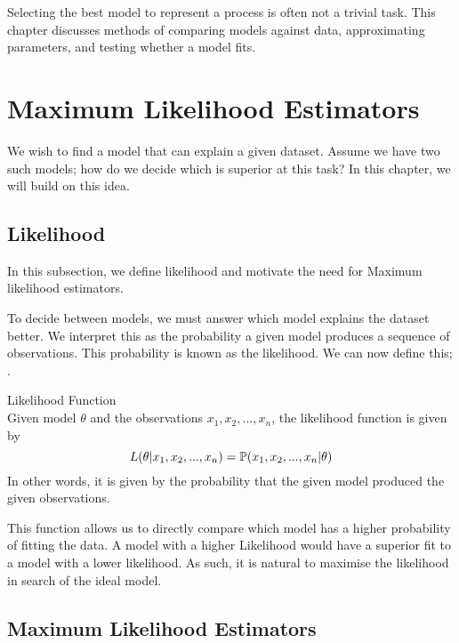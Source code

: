 
Selecting the best model to represent a process is often not a trivial task. This chapter discusses methods of comparing models against data, approximating parameters, and testing whether a model fits. 

\section{Maximum Likelihood Estimators}
\label{Model_Selection:Maximum_Liklihood_Estimators}

We wish to find a model that can explain a given dataset. Assume we have two such models; how do we decide which is superior at this task? In this chapter, we will build on this idea. 

    \subsection{Likelihood}
    \label{Model_Selection:Maximum_Liklihood_Estimators:Likelihood}

    In this subsection, we define likelihood and motivate the need for Maximum likelihood estimators.

    To decide between models, we must answer which model explains the dataset better. We interpret this as the probability a given model produces a sequence of observations. This probability is known as the likelihood. We can now define this; \cite{Ross2004}.

    \begin{definition} Likelihood Function \\
        Given model $\theta$ and the observations $x_1, x_2,...,x_n$, the likelihood function is given by
        \begin{equation}
            \label{Definition:Likelihood}
            L(\theta|x_1, x_2,...,x_n) = \mathbb{P}(x_1, x_2,...,x_n|\theta)
        \end{equation} 
        In other words, it is given by the probability that the given model produced the given observations.
    \end{definition}

    This function allows us to directly compare which model has a higher probability of fitting the data. A model with a higher Likelihood would have a superior fit to a model with a lower likelihood. As such, it is natural to maximise the likelihood in search of the ideal model. 

    \subsection{Maximum Likelihood Estimators}
    \label{Model_Selection:Maximum_Liklihood_Estimators:MLE}

